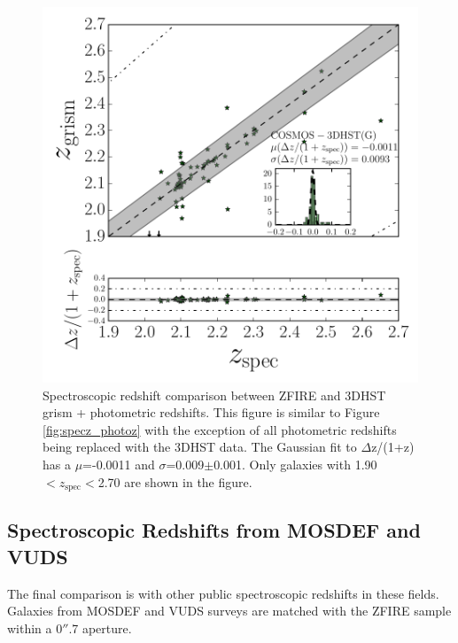 \documentclass[iop]{emulateapj}
\begin{document}
\begin{figure}
\includegraphics[trim = 15 0 5 5, clip, scale=0.59]{figures/specz_vs_3DHST_grism.pdf}
\caption{ Spectroscopic redshift comparison between ZFIRE and 3DHST grism + photometric redshifts. 
This figure is similar to Figure \ref{fig:specz_photoz} with the exception of all photometric redshifts being replaced with the 3DHST \citet{Momcheva2015} data. The Gaussian fit to $\Delta$z/(1+z) has a $\mu$=-0.0011 and $\sigma$=0.009$\pm$0.001. Only galaxies with 1.90$<z_{\mathrm{spec}}<$2.70 are shown in the figure. 
}
\label{fig:specz_3DHST_grism}
\end{figure}



\subsection{Spectroscopic Redshifts from MOSDEF and VUDS}
\label{sec:specz_comparisions}

The final comparison is with other public spectroscopic redshifts in these fields. Galaxies from MOSDEF \citep{Kriek:2014fk} and VUDS \citep{Cassata2015} surveys are matched with the ZFIRE sample within a 0$''$.7 aperture. 
\end{document}
